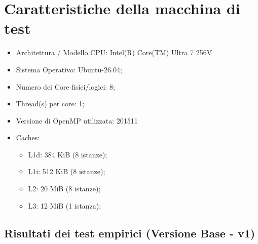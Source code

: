 \documentclass[a4paper,11pt]{article}
\begin{document}
\section{Caratteristiche della macchina di test}
\begin{itemize}
    \item Architettura / Modello CPU: Intel(R) Core(TM) Ultra 7 256V 
    \item Sistema Operativo: Ubuntu-26.04;
    \item Numero dei Core fisici/logici:  8; 
    \item Thread(s) per core: 1; 
    \item Versione di OpenMP utilizzata: 201511
    \item Caches:
    \begin{itemize}
        \item L1d: 384 KiB (8 istanze);
        \item L1i: 512 KiB (8 istanze);
        \item L2: 20 MiB (8 istanze);
        \item L3: 12 MiB (1 istanza);
    \end{itemize}
\end{itemize}
\newpage

\subsection*{Risultati dei test empirici (Versione Base - v1)}
\end{document}
